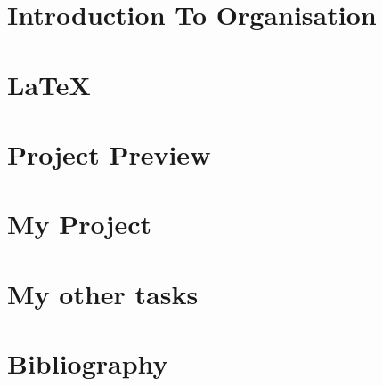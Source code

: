 \documentclass[12pt]{article}
\begin{document}

\begin{screen}
\ppttitle
\end{screen}
\footskip 0.7cm
\thispagestyle{empty} 
\pagetitle
\newpage
{}
\cfoot{\thepage}


\newpage



\newpage
\tableofcontents
\newpage
\listoffigures
\newpage

\cfoot{\thepage}

\newpage
\section{Introduction To Organisation}

\newpage
\section{\LaTeX}

\newpage
\section{Project Preview}

\newpage
\section{My Project}

%
%
\newpage
%
\section{My other tasks}

\newpage
\clearpage
\section{Bibliography}

\begin{screen}
%
\end{screen}
\end{document}
